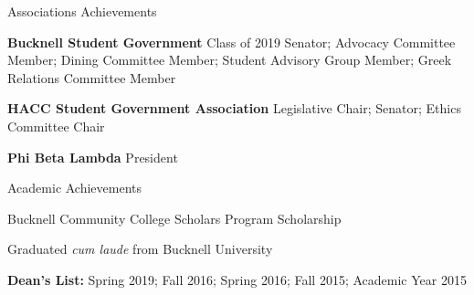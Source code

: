 \documentclass{resume} %
\begin{document}

\begin{rSection}{Associations Achievements} \itemsep -2pt
\item {\bf Bucknell Student Government} Class of 2019 Senator; Advocacy Committee Member; Dining Committee Member; Student Advisory Group Member; Greek Relations Committee Member
\item {\bf HACC Student Government Association} Legislative Chair; Senator; Ethics Committee Chair
\item {\bf Phi Beta Lambda} President


\end{rSection}


\begin{rSection}{Academic Achievements} \itemsep -2pt
\item Bucknell Community College Scholars Program Scholarship
\item Graduated {\it cum laude} from Bucknell University
\item {\bf Dean's List:} Spring 2019; Fall 2016; Spring 2016; Fall 2015; Academic Year 2015


\end{rSection}
\end{document}

